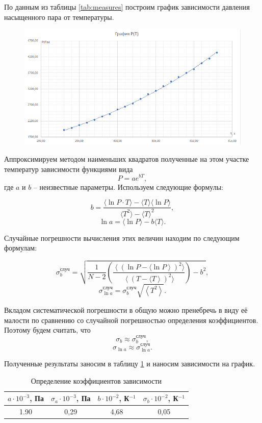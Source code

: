 \documentclass[12pt,a4paper]{article}
\begin{document}
По данным из таблицы \ref{tab:measures} построим график зависимости давления насыщенного пара от температуры.

\begin{figure}[H]
\begin{center}
		\includegraphics[width=15cm]{2.4.1_gr_1}
\end{center}
\end{figure}


Аппроксимируем методом наименьших квадратов полученные на этом участке температур зависимости функциями вида \[ P=ae^{bT}, \] где $ a $ и $ b $ -- неизвестные параметры. Используем следующие формулы:

\[ b = \frac{\langle \ln P \cdot T \rangle - \langle T \rangle \langle \ln P \rangle}{\langle T^2 \rangle - \langle T \rangle ^2},\]
\[ \ln a = \langle \ln P \rangle - b\langle T \rangle. \]

Случайные погрешности вычисления этих величин находим по следующим формулам:

\[ \sigma^\text{случ}_b = \sqrt{\frac{1}{N-2} \left(\frac{\left\langle\left(\ln P - \langle \ln P\right\rangle\right)^2 \rangle}{\left\langle\left(T - \langle T\right\rangle\right)^2 \rangle}\right)-b^2},\]
\[ \sigma^\text{случ}_{\ln a}=\sigma^\text{случ}_b\sqrt{\left\langle T^2 \right\rangle}. \]

\label{mnk}

Вкладом систематической погрешности в общую можно пренебречь в виду её малости по сравнению со случайной погрешностью определения коэффициентов. Поэтому будем считать, что \[ \sigma_b \approx \sigma^\text{случ}_b, \] \[ \sigma_{\ln a} \approx \sigma^\text{случ}_{\ln a}. \]

Полученные результаты заносим в таблицу \ref{tab:ab} и наносим зависимости на график.

\begin{table}[H]
	\centering
	\begin{tabular}{|c|c|c|c|}
		\hline
		$ a \cdot 10^{-3}$, Па & $ \sigma_a \cdot 10^{-3}$, Па & $ b \cdot 10^{-2} $, К$ ^{-1} $ & $ \sigma_b \cdot 10^{-2} $, К$ ^{-1} $ \\ \hline
		1.90 & 0,29 & 4,68 & 0,05 \\ \hline
	\end{tabular}
	\caption{Определение коэффициентов зависимости}
	\label{tab:ab}
\end{table}
\end{document}
